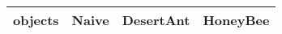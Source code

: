 \begin{tabular} {|l|l|l|l|}
\hline
objects & Naive & DesertAnt & HoneyBee \\
\hline
\hline
\end{tabular}
